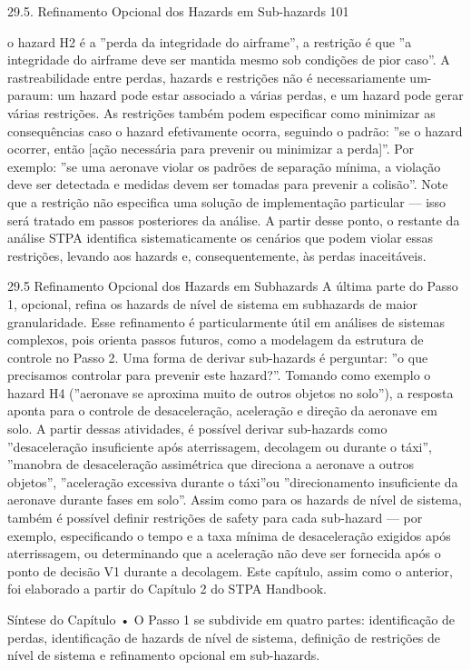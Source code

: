 29.5. Refinamento Opcional dos Hazards em Sub-hazards 101

o hazard H2 é a ”perda da integridade do airframe”, a restrição é que ”a integridade do airframe deve ser mantida mesmo sob condições de pior caso”. A rastreabilidade entre perdas, hazards e restrições não é necessariamente um-paraum: um hazard pode estar associado a várias perdas, e um hazard pode gerar várias restrições. As restrições também podem especificar como minimizar as consequências caso o hazard efetivamente ocorra, seguindo o padrão: ”se o hazard ocorrer, então [ação necessária para prevenir ou minimizar a perda]”. Por exemplo: ”se uma aeronave violar os padrões de separação mínima, a violação deve ser detectada e medidas devem ser tomadas para prevenir a colisão”. Note que a restrição não especifica uma solução de implementação particular — isso será tratado em passos posteriores da análise. A partir desse ponto, o restante da análise STPA identifica sistematicamente os cenários que podem violar essas restrições, levando aos hazards e, consequentemente, às perdas inaceitáveis.

29.5 Refinamento Opcional dos Hazards em Subhazards A última parte do Passo 1, opcional, refina os hazards de nível de sistema em subhazards de maior granularidade. Esse refinamento é particularmente útil em análises de sistemas complexos, pois orienta passos futuros, como a modelagem da estrutura de controle no Passo 2. Uma forma de derivar sub-hazards é perguntar: ”o que precisamos controlar para prevenir este hazard?”. Tomando como exemplo o hazard H4 (”aeronave se aproxima muito de outros objetos no solo”), a resposta aponta para o controle de desaceleração, aceleração e direção da aeronave em solo. A partir dessas atividades, é possível derivar sub-hazards como ”desaceleração insuficiente após aterrissagem, decolagem ou durante o táxi”, ”manobra de desaceleração assimétrica que direciona a aeronave a outros objetos”, ”aceleração excessiva durante o táxi”ou ”direcionamento insuficiente da aeronave durante fases em solo”. Assim como para os hazards de nível de sistema, também é possível definir restrições de safety para cada sub-hazard — por exemplo, especificando o tempo e a taxa mínima de desaceleração exigidos após aterrissagem, ou determinando que a aceleração não deve ser fornecida após o ponto de decisão V1 durante a decolagem. Este capítulo, assim como o anterior, foi elaborado a partir do Capítulo 2 do STPA Handbook.

Síntese do Capítulo • O Passo 1 se subdivide em quatro partes: identificação de perdas, identificação de hazards de nível de sistema, definição de restrições de nível de sistema e refinamento opcional em sub-hazards.

